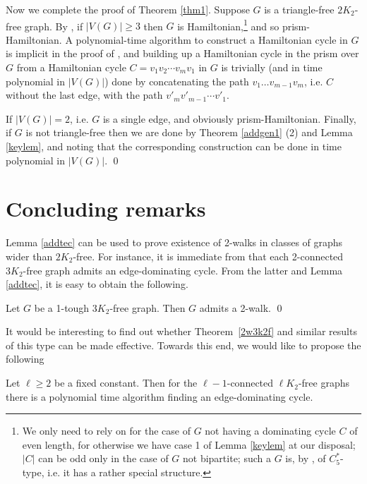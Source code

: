 \documentclass[runningheads,a4paper]{llncs}
\begin{document}
Now we complete the proof of Theorem \ref{thm1}.
Suppose $G$ is a triangle-free $2K_2$-free graph. By \cite[Theorem 4]{broersma2014toughness},
if $|V(G)|\geq 3$ then 
$G$ is Hamiltonian,\footnote{
We only need to rely on  \cite[Theorem 4]{broersma2014toughness}
for the case of $G$ not having a dominating cycle $C$ of even length, for 
otherwise we have case 1 of Lemma \ref{keylem} at our disposal; $|C|$ can be odd
only in the case of $G$ not bipartite; such a $G$ is, by \cite[Lemma 2]{broersma2014toughness},
of $C_5^*$-type, i.e. it has a rather special structure.}
and so prism-Hamiltonian.
A polynomial-time algorithm to construct a Hamiltonian cycle in $G$ is
implicit in the proof of  \cite[Theorem 4]{broersma2014toughness}, and
building up a Hamiltonian cycle in the prism over $G$ from a Hamiltonian
cycle $C=v_1v_2\cdots v_{m}v_1$ in $G$ is trivially (and in time polynomial in $|V(G)|$)
done by concatenating the path $v_1\dots v_{m-1}v_m$, i.e. $C$ without the last edge, with the
path $v'_m v'_{m-1}\cdots v'_1$.

If $|V(G)|=2$, i.e. $G$ is a single edge, and obviously prism-Hamiltonian.
Finally, if $G$ is not triangle-free then we are done by 
Theorem \ref{addgen1} (2) and Lemma \ref{keylem}, and noting that the
corresponding construction can be done in  time polynomial in $|V(G)|$.
\qed

\section{Concluding remarks}

Lemma \ref{addtec} can be used to prove existence of 2-walks in 
classes of graphs wider than $2K_2$-free.
For instance, it is immediate from \cite[Corollary 3.2]{veldman83} that each 2-connected
$3K_2$-free graph admits  an edge-dominating cycle. From the latter and Lemma \ref{addtec},
it is easy to obtain the following.
\begin{theorem}\label{2w3k2f}
Let $G$ be a 1-tough $3K_2$-free graph. Then $G$ admits a 2-walk. \qed
\end{theorem}

It would be interesting to find out whether Theorem~\ref{2w3k2f} and similar results
of this type can be made
effective. Towards this end, we would like to propose the following
\begin{conjecture}
Let $\ell\geq 2$ be a fixed constant. 
Then for the $\ell-1$-connected $\ell K_2$-free
graphs there is a polynomial time algorithm finding an edge-dominating cycle.
\end{conjecture}
\end{document}
